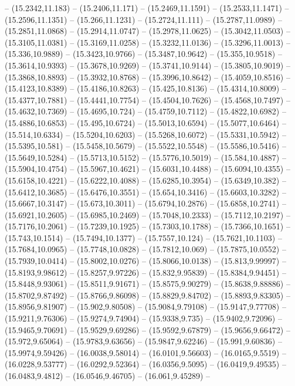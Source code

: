 {-- (15.2342,11.183) -- (15.2406,11.171) -- (15.2469,11.1591) -- (15.2533,11.1471) -- (15.2596,11.1351) -- (15.266,11.1231) -- (15.2724,11.111) -- (15.2787,11.0989) -- (15.2851,11.0868) -- (15.2914,11.0747) -- (15.2978,11.0625) -- (15.3042,11.0503)
-- (15.3105,11.0381) -- (15.3169,11.0258) -- (15.3232,11.0136) -- (15.3296,11.0013) -- (15.336,10.9889) -- (15.3423,10.9766) -- (15.3487,10.9642) -- (15.355,10.9518) -- (15.3614,10.9393) -- (15.3678,10.9269) -- (15.3741,10.9144) -- (15.3805,10.9019)
-- (15.3868,10.8893) -- (15.3932,10.8768) -- (15.3996,10.8642) -- (15.4059,10.8516) -- (15.4123,10.8389) -- (15.4186,10.8263) -- (15.425,10.8136) -- (15.4314,10.8009) -- (15.4377,10.7881) -- (15.4441,10.7754) -- (15.4504,10.7626) --
(15.4568,10.7497) -- (15.4632,10.7369) -- (15.4695,10.724) -- (15.4759,10.7112) -- (15.4822,10.6982) -- (15.4886,10.6853) -- (15.495,10.6724) -- (15.5013,10.6594) -- (15.5077,10.6464) -- (15.514,10.6334) -- (15.5204,10.6203) -- (15.5268,10.6072) --
(15.5331,10.5942) -- (15.5395,10.581) -- (15.5458,10.5679) -- (15.5522,10.5548) -- (15.5586,10.5416) -- (15.5649,10.5284) -- (15.5713,10.5152) -- (15.5776,10.5019) -- (15.584,10.4887) -- (15.5904,10.4754) -- (15.5967,10.4621) -- (15.6031,10.4488) --
(15.6094,10.4355) -- (15.6158,10.4221) -- (15.6222,10.4088) -- (15.6285,10.3954) -- (15.6349,10.382) -- (15.6412,10.3685) -- (15.6476,10.3551) -- (15.654,10.3416) -- (15.6603,10.3282) -- (15.6667,10.3147) -- (15.673,10.3011) -- (15.6794,10.2876) --
(15.6858,10.2741) -- (15.6921,10.2605) -- (15.6985,10.2469) -- (15.7048,10.2333) -- (15.7112,10.2197) -- (15.7176,10.2061) -- (15.7239,10.1925) -- (15.7303,10.1788) -- (15.7366,10.1651) -- (15.743,10.1514) -- (15.7494,10.1377) -- (15.7557,10.124) --
(15.7621,10.1103) -- (15.7684,10.0965) -- (15.7748,10.0828) -- (15.7812,10.069) -- (15.7875,10.0552) -- (15.7939,10.0414) -- (15.8002,10.0276) -- (15.8066,10.0138) -- (15.813,9.99997) -- (15.8193,9.98612) -- (15.8257,9.97226) -- (15.832,9.95839) --
(15.8384,9.94451) -- (15.8448,9.93061) -- (15.8511,9.91671) -- (15.8575,9.90279) -- (15.8638,9.88886) -- (15.8702,9.87492) -- (15.8766,9.86098) -- (15.8829,9.84702) -- (15.8893,9.83305) -- (15.8956,9.81907) -- (15.902,9.80508) -- (15.9084,9.79108)
-- (15.9147,9.77708) -- (15.9211,9.76306) -- (15.9274,9.74904) -- (15.9338,9.735) -- (15.9402,9.72096) -- (15.9465,9.70691) -- (15.9529,9.69286) -- (15.9592,9.67879) -- (15.9656,9.66472) -- (15.972,9.65064) -- (15.9783,9.63656) -- (15.9847,9.62246)
-- (15.991,9.60836) -- (15.9974,9.59426) -- (16.0038,9.58014) -- (16.0101,9.56603) -- (16.0165,9.5519) -- (16.0228,9.53777) -- (16.0292,9.52364) -- (16.0356,9.5095) -- (16.0419,9.49535) -- (16.0483,9.4812) -- (16.0546,9.46705) -- (16.061,9.45289) --
}
